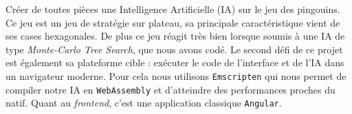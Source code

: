 Créer de toutes pièces une Intelligence Artificielle (IA) sur le jeu des
pingouins. Ce jeu est un jeu de stratégie sur plateau, sa principale
caractéristique vient de ses cases hexagonales. De plus ce jeu réagit
très bien lorsque soumis à une IA de type \emph{Monte-Carlo Tree
Search}, que nous avons codé. Le second défi de ce projet est également
sa plateforme cible : exécuter le code de l'interface et de l'IA dans un
navigateur moderne. Pour cela nous utilisons \texttt{Emscripten} qui
nous permet de compiler notre IA en \texttt{WebAssembly} et d'atteindre
des performances proches du natif. Quant au \emph{frontend}, c'est une
application classique \texttt{Angular}.
